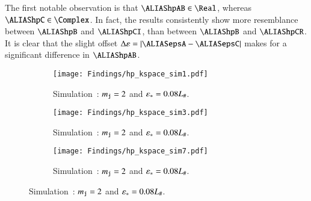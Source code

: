     The first notable observation is that $\hpAB\in \Real$, whereas $\hpC\in \Complex$. In fact, the results consistently show more resemblance between $\hpB$ and $\hpCI$, than between $\hpB$ and $\hpCR$. It is clear that the slight offset $\Delta \varepsilon = \abs{\epsA-\epsC}$ makes for a significant difference in $\hpAB$. %
    \begin{figure}[hb!]
        \centering
        \begin{subfigure}[b]{\linewidth}
            \centering
            \texttt{[image: Findings/hp\_kspace\_sim1.pdf]}
        \caption{Simulation~: $m_{\mathtt{j}}=2$ and $\varepsilon_\ast=0.08L_\#$.}
        \label{fig:results:h11:hp_kspace_sim1}
        \end{subfigure}
        \hfill
        \begin{subfigure}[b]{\linewidth}
            \centering
            \texttt{[image: Findings/hp\_kspace\_sim3.pdf]}
        \caption{Simulation~: $m_{\mathtt{j}}=2$ and $\varepsilon_\ast=0.08L_\#$.}
        \label{fig:results:h11:hp_kspace_sim3}
        \end{subfigure}
        \hfill
        \begin{subfigure}[b]{\linewidth}
            \centering
            \texttt{[image: Findings/hp\_kspace\_sim7.pdf]}
        \caption{Simulation~: $m_{\mathtt{j}}=2$ and $\varepsilon_\ast=0.08L_\#$.}
        \label{fig:results:h11:hp_kspace_sim7}
        \end{subfigure}
    \end{figure}
